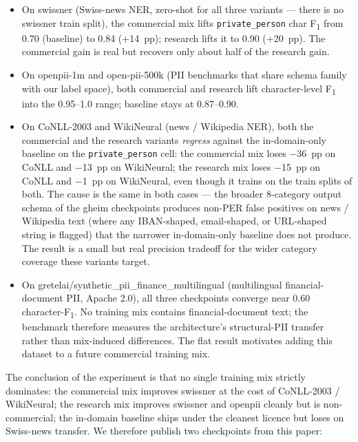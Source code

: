 \documentclass[sigconf,nonacm]{acmart}
\begin{document}
\begin{itemize}
  \item On \textsf{swissner} (Swiss-news NER, zero-shot for all
        three variants — there is no swissner train split), the
        commercial mix lifts \texttt{private\_person} char
        F\textsubscript{1} from 0.70 (baseline) to 0.84 (+14~pp);
        research lifts it to 0.90 (+20~pp). The commercial gain
        is real but recovers only about half of the research
        gain.
  \item On \textsf{openpii-1m} and \textsf{open-pii-500k} (PII
        benchmarks that share schema family with our label space),
        both commercial and research lift character-level
        F\textsubscript{1} into the 0.95--1.0 range; baseline
        stays at 0.87--0.90.
  \item On CoNLL-2003 and WikiNeural (news / Wikipedia NER), both
        the commercial and the research variants \emph{regress}
        against the in-domain-only baseline on the
        \texttt{private\_person} cell: the commercial mix loses
        $-$36~pp on CoNLL and $-$13~pp on WikiNeural; the research
        mix loses $-$15~pp on CoNLL and $-$1~pp on WikiNeural, even
        though it trains on the train splits of both. The cause is
        the same in both cases — the broader 8-category output
        schema of the gheim checkpoints produces non-PER false
        positives on news / Wikipedia text (where any IBAN-shaped,
        email-shaped, or URL-shaped string is flagged) that the
        narrower in-domain-only baseline does not produce. The
        result is a small but real precision tradeoff for the
        wider category coverage these variants target.
  \item On \textsf{gretelai/synthetic\_pii\_finance\_multilingual}
        (multilingual financial-document PII, Apache 2.0), all three
        checkpoints converge near 0.60 character-F\textsubscript{1}.
        No training mix contains financial-document text; the
        benchmark therefore measures the architecture's
        structural-PII transfer rather than mix-induced
        differences. The flat result motivates adding this dataset
        to a future commercial training mix.
\end{itemize}

The conclusion of the experiment is that no single training mix
strictly dominates: the commercial mix improves swissner at the
cost of CoNLL-2003 / WikiNeural; the research mix improves
swissner and openpii cleanly but is non-commercial; the in-domain
baseline ships under the cleanest licence but loses on Swiss-news
transfer. We therefore publish two checkpoints from this paper:
\end{document}
